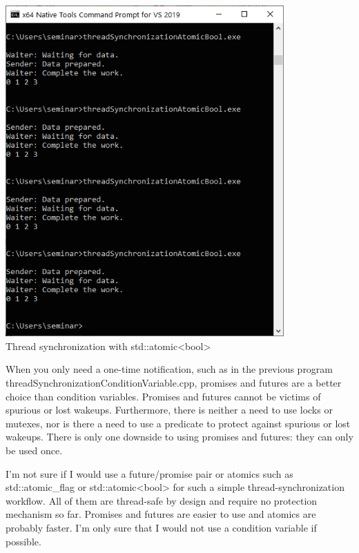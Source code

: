 \begin{center}
\includegraphics[width=0.8\textwidth]{content/3/chapter6/images/14.png}\\
Thread synchronization with std::atomic<bool>
\end{center}

\begin{tcolorbox}[breakable,enhanced jigsaw,colback=blue!5!white,colframe=blue!75!black,title={Condition Variables versus Promise/Future Pairs versus std::atomic\_flag}]
	
When you only need a one-time notification, such as in the previous program threadSynchronizationConditionVariable.cpp, promises and futures are a better choice than condition variables. Promises and futures cannot be victims of spurious or lost wakeups.
Furthermore, there is neither a need to use locks or mutexes, nor is there a need to use a predicate to protect against spurious or lost wakeups. There is only one downside to using promises and futures: they can only be used once.


I’m not sure if I would use a future/promise pair or atomics such as std::atomic\_flag or std::atomic<bool> for such a simple thread-synchronization workflow. All of them are thread-safe by design and require no protection mechanism so far. Promises and futures are easier to use and atomics are probably faster. I’m only sure that I would not use a condition variable if possible.
	
\end{tcolorbox}


